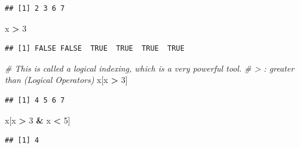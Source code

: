 \documentclass[]{book}
\newenvironment{Shaded}{\begin{snugshade}}{\end{snugshade}}
\newcommand{\CommentTok}[1]{\textcolor[rgb]{0.56,0.35,0.01}{\textit{#1}}}
\newcommand{\DecValTok}[1]{\textcolor[rgb]{0.00,0.00,0.81}{#1}}
\newcommand{\KeywordTok}[1]{\textcolor[rgb]{0.13,0.29,0.53}{\textbf{#1}}}
\newcommand{\NormalTok}[1]{#1}
\newcommand{\OperatorTok}[1]{\textcolor[rgb]{0.81,0.36,0.00}{\textbf{#1}}}
\newcommand{\StringTok}[1]{\textcolor[rgb]{0.31,0.60,0.02}{#1}}
\begin{document}
\begin{verbatim}
## [1] 2 3 6 7
\end{verbatim}

\begin{Shaded}
\begin{Highlighting}[]
\NormalTok{x }\OperatorTok{>}\StringTok{ }\DecValTok{3}
\end{Highlighting}
\end{Shaded}

\begin{verbatim}
## [1] FALSE FALSE  TRUE  TRUE  TRUE  TRUE
\end{verbatim}

\begin{Shaded}
\begin{Highlighting}[]
\CommentTok{# This is called a logical indexing, which is a very powerful tool.}
\CommentTok{# > : greater than (Logical Operators)}
\NormalTok{x[x }\OperatorTok{>}\StringTok{ }\DecValTok{3}\NormalTok{]   }
\end{Highlighting}
\end{Shaded}

\begin{verbatim}
## [1] 4 5 6 7
\end{verbatim}

\begin{Shaded}
\begin{Highlighting}[]
\NormalTok{x[x }\OperatorTok{>}\StringTok{ }\DecValTok{3} \OperatorTok{&}\StringTok{ }\NormalTok{x }\OperatorTok{<}\StringTok{ }\DecValTok{5}\NormalTok{]}
\end{Highlighting}
\end{Shaded}

\begin{verbatim}
## [1] 4
\end{verbatim}

\begin{Shaded}
\end{Shaded}
\end{document}
